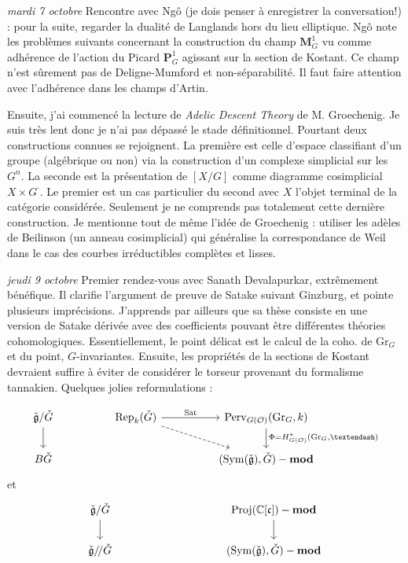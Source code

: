 \documentclass[11.8pt]{amsart}
\theoremstyle{plain}
\theoremstyle{definition}
\theoremstyle{remark}
\begin{document}
\textsl{mardi 7 octobre} \quad Rencontre avec Ngô (je dois penser à enregistrer la conversation!) : pour la suite, regarder la dualité de Langlands hors du lieu elliptique. Ngô note les problèmes suivants concernant la construction du champ $\mathbf M^1_G$ vu comme adhérence de l'action du Picard $\mathbf P^1_G$ agissant sur la section de Kostant. Ce champ n'est sûrement pas de Deligne-Mumford et non-séparabilité. Il faut faire attention avec l'adhérence dans les champs d'Artin. 

Ensuite, j'ai commencé la lecture de \textsl{Adelic Descent Theory} de M. Groechenig. Je suis très lent donc je n'ai pas dépassé le stade définitionnel. Pourtant deux constructions connues se rejoignent. La première est celle d'espace classifiant d'un groupe (algébrique ou non) via la construction d'un complexe simplicial sur les $G^n$. La seconde est la présentation de $[X/G]$ comme diagramme cosimplicial $X\times G^\cdot$. Le premier est un cas particulier du second avec $X$ l'objet terminal de la catégorie considérée. Seulement je ne comprends pas totalement cette dernière construction. Je mentionne tout de même l'idée de Groechenig : utiliser les adèles de Beilinson (un anneau cosimplicial) qui généralise la correspondance de Weil dans le cas des courbes irréductibles complètes et lisses. 
\vspace{10pt}

\textsl{jeudi 9 octobre} \quad Premier rendez-vous avec Sanath Devalapurkar, extrêmement bénéfique. Il clarifie l'argument de preuve de Satake suivant Ginzburg, et pointe plusieurs imprécisions. J'apprends par ailleurs que sa thèse consiste en une version de Satake dérivée avec des coefficients pouvant être différentes théories cohomologiques. Essentiellement, le point délicat est le calcul de la coho. de $\mathrm{Gr}_G$ et du point, $G$-invariantes. Ensuite, les propriétés de la sections de Kostant devraient suffire à éviter de considérer le torseur provenant du formalisme tannakien. Quelques jolies reformulations :   

\[\begin{tikzcd}
	{\mathfrak{\check{g}}/\check G} && {\mathrm{Rep}_k(\check{G})} && {\mathrm{Perv}_{G(\mathcal O)}(\mathrm{Gr}_G, k)} \\
	{B\check G} &&&& {(\mathrm{Sym}(\mathfrak{\check{g}}), \check G)-\mathbf {mod}}
	\arrow[from=1-1, to=2-1]
	\arrow["{\mathrm{Sat}}", from=1-3, to=1-5]
	\arrow[dashed, from=1-3, to=2-5]
	\arrow["{\Phi = H^*_{G(\mathcal O)}(\mathrm{Gr}_G, –)}", from=1-5, to=2-5]
\end{tikzcd}\]
et
\[\begin{tikzcd}
	{\mathfrak{\check{g}}/\check G} &&&& {\mathrm{Proj}( \mathbb C[\mathfrak c])-\mathbf {mod}} \\
	{\mathfrak{\check{g}}/\!/ \check G} &&&& {(\mathrm{Sym}(\mathfrak{\check{g}}), \check G)-\mathbf {mod}}
	\arrow[from=1-1, to=2-1]
	\arrow[from=1-5, to=2-5]
\end{tikzcd}\]
\vspace{10pt}
\end{document}
